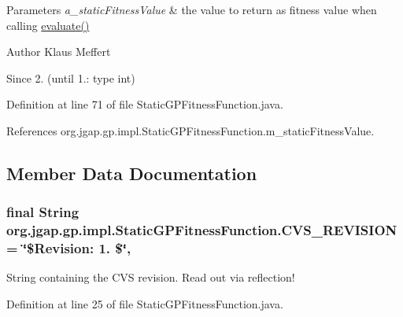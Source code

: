 \begin{DoxyParams}{Parameters}
{\em a\-\_\-static\-Fitness\-Value} & the value to return as fitness value when calling \hyperlink{classorg_1_1jgap_1_1gp_1_1impl_1_1_static_g_p_fitness_function_a6c7d3a6b028de6926c85191ecaab0d63}{evaluate()}\\
\hline
\end{DoxyParams}
\begin{DoxyAuthor}{Author}
Klaus Meffert 
\end{DoxyAuthor}
\begin{DoxySince}{Since}
2. (until 1.\-: type int) 
\end{DoxySince}


Definition at line 71 of file Static\-G\-P\-Fitness\-Function.\-java.



References org.\-jgap.\-gp.\-impl.\-Static\-G\-P\-Fitness\-Function.\-m\-\_\-static\-Fitness\-Value.



\subsection{Member Data Documentation}
\hypertarget{classorg_1_1jgap_1_1gp_1_1impl_1_1_static_g_p_fitness_function_a166c55c9f8b378afe7826742ba0b50ed}{
\subsubsection[{C\-V\-S\-\_\-\-R\-E\-V\-I\-S\-I\-O\-N}]{\setlength{\rightskip}{0pt plus 5cm}final String org.\-jgap.\-gp.\-impl.\-Static\-G\-P\-Fitness\-Function.\-C\-V\-S\-\_\-\-R\-E\-V\-I\-S\-I\-O\-N = \char`\"{}\$Revision\-: 1. \$\char`\"{}\hspace{0.3cm}{\ttfamily [static]}, {\ttfamily [private]}}}\label{classorg_1_1jgap_1_1gp_1_1impl_1_1_static_g_p_fitness_function_a166c55c9f8b378afe7826742ba0b50ed}
String containing the C\-V\-S revision. Read out via reflection! 

Definition at line 25 of file Static\-G\-P\-Fitness\-Function.\-java.

